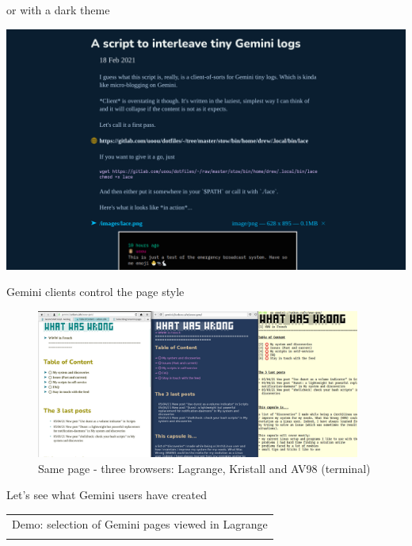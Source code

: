 \documentclass[presentation, 11pt,  aspectratio=169]{beamer}
\begin{document}
\begin{frame}[label={sec:org3cc578a}]{or with a dark theme}
\begin{center}
\includegraphics[width=.9\linewidth]{images/gemini-sample-lace-dark.png}
\end{center}
\end{frame}
\begin{frame}[label={sec:org81e0c5c}]{Gemini clients control the page style}
\begin{figure}[htbp]
\centering
\includegraphics[width=0.95\textwidth]{images/threebrowsers.png}
\caption{Same page - three browsers: Lagrange, Kristall and AV98 (terminal)}
\end{figure}
\end{frame}

\begin{frame}[label={sec:orgd8f222e}]{Let's see what Gemini users have created}
\begin{center}
\begin{tabular}{c}
Demo:   selection of Gemini pages viewed in Lagrange\\
\\
\end{tabular}
\end{center}
\end{frame}
\end{document}

